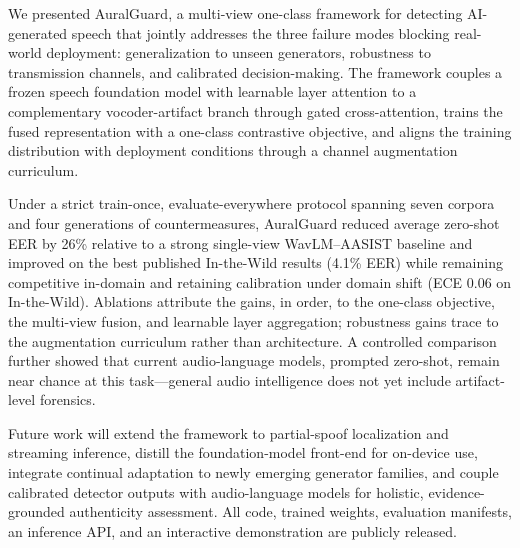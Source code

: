 
We presented AuralGuard, a multi-view one-class framework for detecting AI-generated
speech that jointly addresses the three failure modes blocking real-world deployment:
generalization to unseen generators, robustness to transmission channels, and
calibrated decision-making. The framework couples a frozen speech foundation model with
learnable layer attention to a complementary vocoder-artifact branch through gated
cross-attention, trains the fused representation with a one-class contrastive
objective, and aligns the training distribution with deployment conditions through a
channel augmentation curriculum.

Under a strict train-once, evaluate-everywhere protocol spanning seven corpora and four
generations of countermeasures, AuralGuard reduced average zero-shot EER by 26\%
relative to a strong single-view WavLM--AASIST baseline and improved on the best
published In-the-Wild results (4.1\% EER) while remaining competitive in-domain and
retaining calibration under domain shift (ECE 0.06 on In-the-Wild). Ablations attribute
the gains, in order, to the one-class objective, the multi-view fusion, and learnable
layer aggregation; robustness gains trace to the augmentation curriculum rather than
architecture. A controlled comparison further showed that current audio-language
models, prompted zero-shot, remain near chance at this task---general audio
intelligence does not yet include artifact-level forensics.

Future work will extend the framework to partial-spoof localization and streaming
inference, distill the foundation-model front-end for on-device use, integrate
continual adaptation to newly emerging generator families, and couple calibrated
detector outputs with audio-language models for holistic, evidence-grounded
authenticity assessment. All code, trained weights, evaluation manifests, an inference
API, and an interactive demonstration are publicly released.
